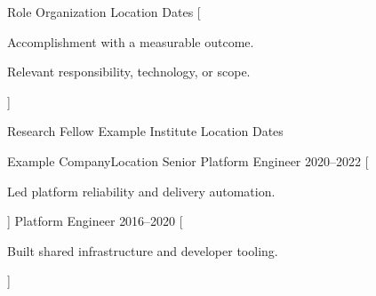 

\begin{cventries}

  \cventry
    {Role} %
    {Organization} %
    {Location} %
    {Dates} %
    [
      \begin{cvitems}
        \item {Accomplishment with a measurable outcome.}
        \item {Relevant responsibility, technology, or scope.}
      \end{cvitems}
    ]

  \cventry
    {Research Fellow} %
    {Example Institute} %
    {Location} %
    {Dates} %

  \begin{cvmultirole}{Example Company}{Location}
    \cvrole
      {Senior Platform Engineer}
      {2020--2022}
      [
        \begin{cvitems}
          \item {Led platform reliability and delivery automation.}
        \end{cvitems}
      ]
    \cvrole
      {Platform Engineer}
      {2016--2020}
      [
        \begin{cvitems}
          \item {Built shared infrastructure and developer tooling.}
        \end{cvitems}
      ]
  \end{cvmultirole}

\end{cventries}

